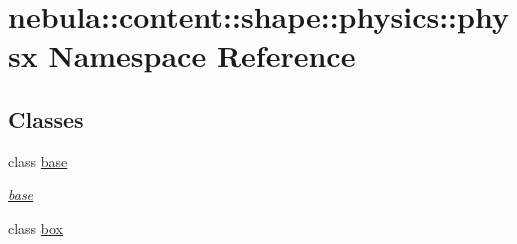 \hypertarget{namespacenebula_1_1content_1_1shape_1_1physics_1_1physx}{
\section{nebula::content::shape::physics::physx Namespace Reference}
\label{namespacenebula_1_1content_1_1shape_1_1physics_1_1physx}
}
\subsection*{Classes}
\begin{DoxyCompactItemize}
\item 
class \hyperlink{classnebula_1_1content_1_1shape_1_1physics_1_1physx_1_1base}{base}
\begin{DoxyCompactList}\small\item\em \hyperlink{classnebula_1_1content_1_1shape_1_1physics_1_1physx_1_1base}{base} \item\end{DoxyCompactList}\item 
class \hyperlink{classnebula_1_1content_1_1shape_1_1physics_1_1physx_1_1box}{box}
\end{DoxyCompactItemize}

